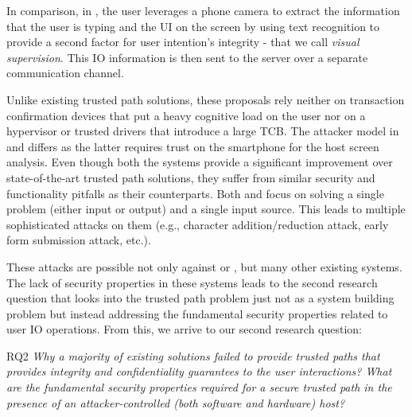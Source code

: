 In comparison, in \integriscreen, the user leverages a phone camera to extract the information that the user is typing and the UI on the screen by using text recognition to provide a second factor for user intention's integrity - that we call \emph{visual supervision}. This IO information is then sent to the server over a separate communication channel. 

Unlike existing trusted path solutions, these proposals rely neither on transaction confirmation devices that put a heavy cognitive load on the user nor on a hypervisor or trusted drivers that introduce a large TCB. The attacker model in \integrikey and \integriscreen differs as the latter requires trust on the smartphone for the host screen analysis. Even though both the systems provide a significant improvement over state-of-the-art trusted path solutions, they suffer from similar security and functionality pitfalls as their counterparts. Both \integrikey and \integriscreen focus on solving a single problem (either input or output) and a single input source. This leads to multiple sophisticated attacks on them (e.g., character addition/reduction attack, early form submission attack, etc.). 

These attacks are possible not only against \integrikey or \integriscreen, but many other existing systems. The lack of security properties in these systems leads to the second research question that looks into the trusted path problem just not as a system building problem but instead addressing the fundamental security properties related to user IO operations. From this, we arrive to our second research question:

\begin{mybox}[colback=white]{RQ2}
\emph{Why a majority of existing solutions failed to provide trusted paths that provides integrity and confidentiality guarantees to the user interactions? What are the fundamental security properties required for a secure trusted path in the presence of an attacker-controlled (both software and hardware) host?}
\end{mybox}

 
    
